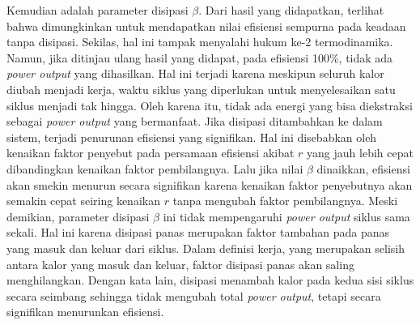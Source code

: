 \par Kemudian adalah parameter disipasi \(\beta\). Dari hasil yang didapatkan, terlihat bahwa dimungkinkan untuk mendapatkan nilai efisiensi sempurna pada keadaan tanpa disipasi. Sekilas, hal ini tampak menyalahi hukum ke-2 termodinamika. Namun, jika ditinjau ulang hasil yang didapat, pada efisiensi 100\%, tidak ada \textit{power output} yang dihasilkan. Hal ini terjadi karena meskipun seluruh kalor diubah menjadi kerja, waktu siklus yang diperlukan untuk menyelesaikan satu siklus menjadi tak hingga. Oleh karena itu, tidak ada energi yang bisa diekstraksi sebagai \textit{power output} yang bermanfaat. Jika disipasi ditambahkan ke dalam sistem, terjadi penurunan efisiensi yang signifikan. Hal ini disebabkan oleh kenaikan faktor penyebut pada persamaan efisiensi akibat \(r\) yang jauh lebih cepat dibandingkan kenaikan faktor pembilangnya. Lalu jika nilai \(\beta\) dinaikkan, efisiensi akan smekin menurun secara signifikan karena kenaikan faktor penyebutnya akan semakin cepat seiring kenaikan \(r\) tanpa mengubah faktor pembilangnya. Meski demikian, parameter disipasi \(\beta\) ini tidak mempengaruhi \textit{power output} siklus sama sekali. Hal ini karena disipasi panas merupakan faktor tambahan pada panas yang masuk dan keluar dari siklus. Dalam definisi kerja, yang merupakan selisih antara kalor yang masuk dan keluar, faktor disipasi panas akan saling menghilangkan. Dengan kata lain, disipasi menambah kalor pada kedua sisi siklus secara seimbang sehingga tidak mengubah total \textit{power output}, tetapi secara signifikan menurunkan efisiensi.

\newpage
















